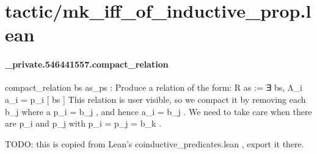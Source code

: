 \documentclass{article}
\begin{document}
\section{tactic/mk\_iff\_of\_inductive\_prop.lean}\paragraph{\_private.546441557.compact\_relation}
\par
\colorbox[RGB]{253,246,227}{{{{\color[RGB]{101, 123, 131} compact\_relation bs as\_ps }}}}: Produce a relation of the form:
R as := ∃ bs, Λ\_i a\_i = p\_i
{[}
bs
{]}
This relation is user visible, so we compact it by removing each 
\colorbox[RGB]{253,246,227}{{{{\color[RGB]{101, 123, 131} b\_j }}}} where a 
\colorbox[RGB]{253,246,227}{{{{\color[RGB]{101, 123, 131} p\_i  }}}{{{\color[RGB]{181, 137, 0} = }}}{{{\color[RGB]{101, 123, 131}  b\_j }}}}, and
hence 
\colorbox[RGB]{253,246,227}{{{{\color[RGB]{101, 123, 131} a\_i  }}}{{{\color[RGB]{181, 137, 0} = }}}{{{\color[RGB]{101, 123, 131}  b\_j }}}}. We need to take care when there are 
\colorbox[RGB]{253,246,227}{{{{\color[RGB]{101, 123, 131} p\_i }}}} and 
\colorbox[RGB]{253,246,227}{{{{\color[RGB]{101, 123, 131} p\_j }}}} with 
\colorbox[RGB]{253,246,227}{{{{\color[RGB]{101, 123, 131} p\_i  }}}{{{\color[RGB]{181, 137, 0} = }}}{{{\color[RGB]{101, 123, 131}  p\_j  }}}{{{\color[RGB]{181, 137, 0} = }}}{{{\color[RGB]{101, 123, 131}  b\_k }}}}.
\par
TODO: this is copied from Lean's 
\colorbox[RGB]{253,246,227}{{{{\color[RGB]{101, 123, 131} coinductive\_predicates.lean }}}}, export it there.
\end{document}
